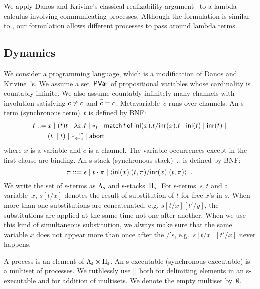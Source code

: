 \documentclass[envcountsame]{llncs}
\begin{document}
We apply Danos and Krivine's classical realizability
argument~\citep{danos-krivine} to a
lambda calculus involving
communicating processes.  Although the formulation is similar to
\citep{danos-krivine}, our formulation allows different processes to
pass around lambda terms.

\subsection{Dynamics}
We consider a programming language, which is a modification of
Danos and Krivine~\citep{danos-krivine}'s.
We assume a set~$\mathsf{PVar}$ of propositional variables whose cardinality is
countably infinite.
We also assume countably infinitely many channels with involution
satisfying $\bar{c}\neq c$ and $\bar{\bar{c}} = c$.
Metavariable~$c$ runs over channels.
An s-term (synchronous term)~$t$ is defined by BNF:
\begin{align*}
 t::= \,&x
 \mid (t)t
 \mid \lambda x.t
 \mid \ast_t
 \mid \mathsf{match}\,{t}\,\mathsf{of}\, \mathsf{inl}({x}). {t}/ \mathsf{inr}({x}). {t}
 \mid \mathsf{inl}({t})
 \mid \mathsf{inr}({t})
 \mid \\ &
 (t\parallel t)
 \mid \ast^{\rightarrow {c}}_{\leftarrow{c}}
 \mid \mathsf{abort\,}
\end{align*}
where $x$ is a variable and $c$ is a channel.  The variable occurrences
except in the first clause are binding.
An s-stack (synchronous stack)~$\pi$ is defined by BNF:
\[
 \pi ::= \epsilon
 \mid t\cdot \pi
 \mid \langle \mathsf{inl}({x}). ({t},{\pi})/ \mathsf{inr}({x}). ({t},{\pi})\rangle
 \enspace.
\]
We write the set of s-terms as $\Lambda_{\mathsf s}$ and s-stacks~$\Pi_{\mathsf s}$.
For s-terms~$s,t$ and a variable~$x$, $s[t/x]$ denotes the result of
substitution of $t$ for free $x$'s in $s$.  When more than one
substitutions are concatenated, e.g. $s[t/x][t'/y]$, the substitutions
are applied at the same time not one after another.  When we use this
kind of simultaneous substitution, we always make sure that the same
variable $x$ does not appear more than once after the $/$'s,
e.g.~$s[t/x][t'/x]$ never happens.

A process is an element of $\Lambda_{\mathsf s}\times\Pi_{\mathsf s}$.
An s-executable (synchronous executable)
is a multiset of processes.
We ruthlessly use $\parallel$ both for delimiting elements in an
s-executable and for addition of multisets.
We denote the empty multiset by~$\emptyset$.
\end{document}
